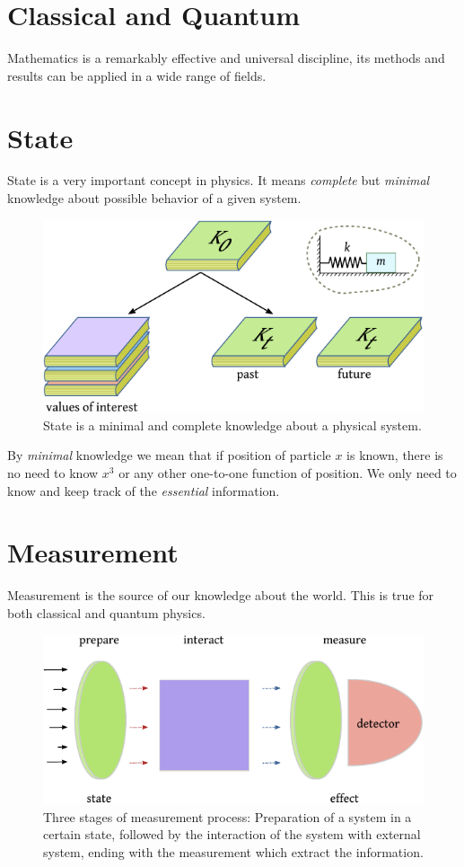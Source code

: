 \section{Classical and Quantum}
Mathematics is a remarkably effective and universal discipline, its
methods and
results can be applied in a wide range of fields.

\section{State}
State is a very important concept in physics. It means \emph{complete} but \emph{minimal} knowledge about  possible behavior of a given system.
\begin{figure}[htbp]
	\centering
	\includegraphics[scale=1.0]{stateAsKnowledge}
	\caption{State is a minimal and complete knowledge about a physical system.}
	\label{fig:stateAsKnowledge}
\end{figure}
By \emph{minimal} knowledge we mean that if position of particle $x$ is known, there is no need to know $x^3$ or any other one-to-one function of position. We only need to know and keep track of the \emph{essential} information.


\section{Measurement}
Measurement is the source of our knowledge about the world. This is true for both classical and quantum physics. 
\begin{figure}[htbp]
	\centering
	\includegraphics[scale=1.0]{measurementStages}
	\caption{Three stages of measurement process: Preparation of a system in a certain state, followed by the interaction of the system with external system, ending with the measurement which extract the information.}
	\label{fig:measurementStages}
\end{figure}

